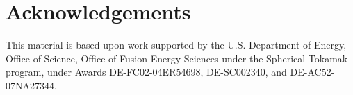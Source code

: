 \section*{Acknowledgements}

This material is based upon work supported by the U.S. Department of Energy, Office of Science, Office of Fusion Energy Sciences under the Spherical Tokamak program,
under Awards 
DE-FC02-04ER54698,  %
DE-SC002340, %
and
DE-AC52-07NA27344.  %

